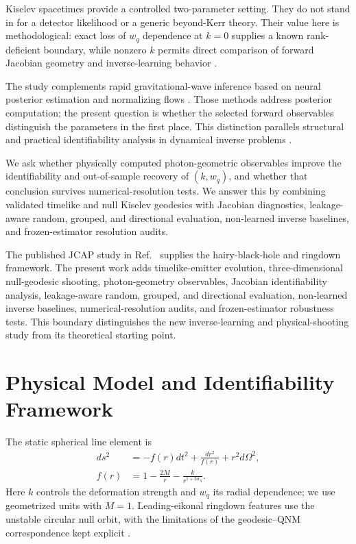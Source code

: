 \documentclass[11pt]{article}
\newcommand{\wq}{w_q}
\begin{document}
Kiselev spacetimes provide a controlled two-parameter setting. They do not
stand in for a detector likelihood or a generic beyond-Kerr theory. Their value
here is methodological: exact loss of $\wq$ dependence at $k=0$ supplies a known
rank-deficient boundary, while nonzero $k$ permits direct comparison of forward
Jacobian geometry and inverse-learning behavior \cite{kiselev2003quintessence}.

The study complements rapid gravitational-wave inference based on neural
posterior estimation and normalizing flows
\cite{dax2021realtime,green2020autoregressive,gabbard2022cvae,cranmer2020frontier,papamakarios2021normalizing,pacilio2024ringdown}.
Those methods address posterior computation; the present question is whether
the selected forward observables distinguish the parameters in the first
place. This distinction parallels structural and practical identifiability
analysis in dynamical inverse problems \cite{raue2009identifiability,villaverde2019identifiability}.

We ask whether physically computed photon-geometric observables improve the
identifiability and out-of-sample recovery of $(k,\wq)$, and whether that
conclusion survives numerical-resolution tests. We answer this by combining
validated timelike and null Kiselev geodesics with Jacobian diagnostics,
leakage-aware random, grouped, and directional evaluation, non-learned inverse
baselines, and frozen-estimator resolution audits.

The published JCAP study in Ref.~\cite{palominoylla2026ringdown} supplies the
hairy-black-hole and ringdown framework. The present work adds timelike-emitter
evolution, three-dimensional null-geodesic shooting, photon-geometry
observables, Jacobian identifiability analysis, leakage-aware random, grouped,
and directional evaluation, non-learned inverse baselines, numerical-resolution
audits, and frozen-estimator robustness tests. This boundary distinguishes the
new inverse-learning and physical-shooting study from its theoretical starting
point.

\section{Physical Model and Identifiability Framework}
The static spherical line element is
\begin{align}
 ds^2&=-f(r)dt^2+\frac{dr^2}{f(r)}+r^2d\Omega^2,\\
 f(r)&=1-\frac{2M}{r}-\frac{k}{r^{1+3\wq}}.
\end{align}
Here $k$ controls the deformation strength and $\wq$ its radial dependence; we
use geometrized units with $M=1$. Leading-eikonal ringdown features use the
unstable circular null orbit, with the limitations of the geodesic--QNM
correspondence kept explicit
\cite{cardoso2009geodesic,konoplya2017correspondence,palominoylla2026ringdown}.
\end{document}
